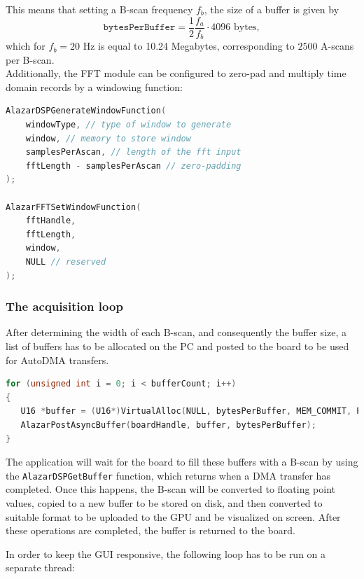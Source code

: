 This means that setting a B-scan frequency $f_b$, the size of a buffer is given by
\begin{equation}\label{eq:bytesperbuffer}
	\texttt{bytesPerBuffer} = \frac{1}{2} \frac{f_a}{f_b} \cdot 4096 \text{ bytes},
\end{equation}
which for $f_b = 20$ Hz is equal to 10.24 Megabytes, corresponding to $2500$ A-scans per B-scan.\\

Additionally, the FFT module can be configured to zero-pad and multiply time domain records by a windowing function:
\begin{lstlisting}[language=C,frame=tb]
AlazarDSPGenerateWindowFunction(
	windowType, // type of window to generate
	window, // memory to store window
	samplesPerAscan, // length of the fft input
	fftLength - samplesPerAscan	// zero-padding
);

AlazarFFTSetWindowFunction(
	fftHandle,
	fftLength,
	window,
	NULL // reserved 
);
\end{lstlisting}

\subsubsection{The acquisition loop}\label{sub:acq-loop}
After determining the width of each B-scan, and consequently the buffer size, a list of buffers has to be allocated on the PC and posted to the board to be used for AutoDMA transfers. 

\begin{lstlisting}[language=C,frame=tb]
for (unsigned int i = 0; i < bufferCount; i++)
{
   U16 *buffer = (U16*)VirtualAlloc(NULL, bytesPerBuffer, MEM_COMMIT, PAGE_READWRITE);
   AlazarPostAsyncBuffer(boardHandle, buffer, bytesPerBuffer);
}
\end{lstlisting}

The application will wait for the board to fill these buffers with a B-scan by using the \texttt{AlazarDSPGetBuffer} function, which returns when a DMA transfer has completed. Once this happens, the B-scan will be converted to floating point values, copied to a new buffer to be stored on disk, and then converted to suitable format to be uploaded to the GPU and be visualized on screen. After these operations are completed, the buffer is returned to the board. 

In order to keep the GUI responsive, the following loop has to be run on a separate thread:

